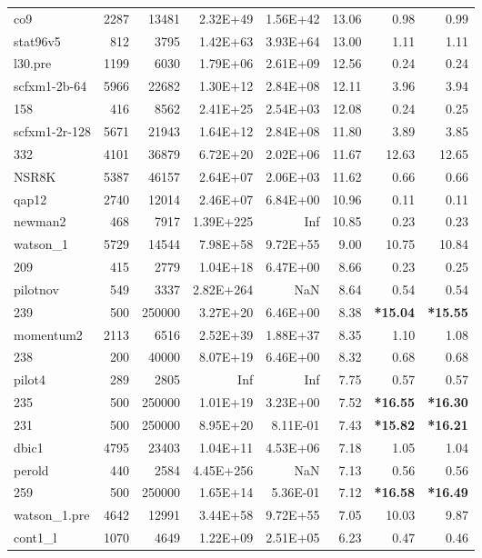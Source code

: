\documentclass[10pt]{article}
\newcommand{\red}{
	\color{red}	
	}
\begin{document}
\begin{longtable}{|l|r|r|r|r|r|r|r|}
co9	&	2287	&	13481	&	2.32E+49	&	1.56E+42	&	13.06	&	0.98	&	0.99	\\
stat96v5	&	812	&	3795	&	1.42E+63	&	3.93E+64	&	13.00	&	1.11	&	1.11	\\
l30.pre	&	1199	&	6030	&	1.79E+06	&	2.61E+09	&	12.56	&	0.24	&	0.24	\\
scfxm1-2b-64	&	5966	&	22682	&	1.30E+12	&	2.84E+08	&	12.11	&	3.96	&	3.94	\\
158	&	416	&	8562	&	2.41E+25	&	2.54E+03	&	12.08	&	0.24	&	0.25	\\
scfxm1-2r-128	&	5671	&	21943	&	1.64E+12	&	2.84E+08	&	11.80	&	3.89	&	3.85	\\
332	&	4101	&	36879	&	6.72E+20	&	2.02E+06	&	11.67	&	12.63	&	12.65	\\
NSR8K	&	5387	&	46157	&	2.64E+07	&	2.06E+03	&	11.62	&	0.66	&	0.66	\\
qap12	&	2740	&	12014	&	2.46E+07	&	6.84E+00	&	10.96	&	0.11	&	0.11	\\
newman2	&	468	&	7917	&	1.39E+225	&	Inf	&	10.85	&	0.23	&	0.23	\\
watson\_1	&	5729	&	14544	&	7.98E+58	&	9.72E+55	&	9.00	&	10.75	&	10.84	\\
209	&	415	&	2779	&	1.04E+18	&	6.47E+00	&	8.66	&	0.23	&	0.25	\\
pilotnov	&	549	&	3337	&	2.82E+264	&	NaN	&	8.64	&	0.54	&	0.54	\\
239	&	500	&	250000	&	3.27E+20	&	6.46E+00	&	8.38	&	{\bf \red *15.04}	&	{\bf \red *15.55}	\\
momentum2	&	2113	&	6516	&	2.52E+39	&	1.88E+37	&	8.35	&	1.10	&	1.08	\\
238	&	200	&	40000	&	8.07E+19	&	6.46E+00	&	8.32	&	0.68	&	0.68	\\
pilot4	&	289	&	2805	&	Inf	&	Inf	&	7.75	&	0.57	&	0.57	\\
235	&	500	&	250000	&	1.01E+19	&	3.23E+00	&	7.52	&	{\bf \red *16.55} 	&	{\bf \red *16.30} 	\\
231	&	500	&	250000	&	8.95E+20	&	8.11E-01	&	7.43	&	{\bf \red *15.82} 	&	{\bf \red *16.21} 	\\
dbic1	&	4795	&	23403	&	1.04E+11	&	4.53E+06	&	7.18	&	1.05	&	1.04	\\
perold	&	440	&	2584	&	4.45E+256	&	NaN	&	7.13	&	0.56	&	0.56	\\
259	&	500	&	250000	&	1.65E+14	&	5.36E-01	&	7.12	&	{\bf \red *16.58} 	&	{\bf \red *16.49} 	\\
watson\_1.pre	&	4642	&	12991	&	3.44E+58	&	9.72E+55	&	7.05	&	10.03	&	9.87	\\
cont1\_l	&	1070	&	4649	&	1.22E+09	&	2.51E+05	&	6.23	&	0.47	&	0.46	\\

\end{longtable}
\end{document}
